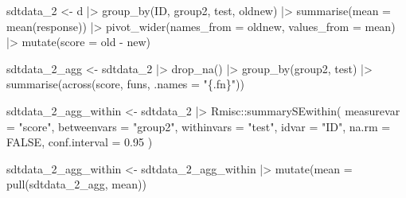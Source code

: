 \documentclass[
  man,floatsintext]{apa7}
\newenvironment{Shaded}{\begin{snugshade}}{\end{snugshade}}
\newcommand{\AttributeTok}[1]{\textcolor[rgb]{0.77,0.63,0.00}{#1}}
\newcommand{\ConstantTok}[1]{\textcolor[rgb]{0.00,0.00,0.00}{#1}}
\newcommand{\FloatTok}[1]{\textcolor[rgb]{0.00,0.00,0.81}{#1}}
\newcommand{\FunctionTok}[1]{\textcolor[rgb]{0.00,0.00,0.00}{#1}}
\newcommand{\NormalTok}[1]{#1}
\newcommand{\OtherTok}[1]{\textcolor[rgb]{0.56,0.35,0.01}{#1}}
\newcommand{\SpecialCharTok}[1]{\textcolor[rgb]{0.00,0.00,0.00}{#1}}
\newcommand{\StringTok}[1]{\textcolor[rgb]{0.31,0.60,0.02}{#1}}
\begin{document}
\begin{Shaded}
\begin{Highlighting}[]
\NormalTok{sdtdata\_2 }\OtherTok{\textless{}{-}}\NormalTok{ d }\SpecialCharTok{|\textgreater{}}
  \FunctionTok{group\_by}\NormalTok{(ID, group2, test, oldnew) }\SpecialCharTok{|\textgreater{}}
  \FunctionTok{summarise}\NormalTok{(}\AttributeTok{mean =} \FunctionTok{mean}\NormalTok{(response)) }\SpecialCharTok{|\textgreater{}}
  \FunctionTok{pivot\_wider}\NormalTok{(}\AttributeTok{names\_from =}\NormalTok{ oldnew, }\AttributeTok{values\_from =}\NormalTok{ mean) }\SpecialCharTok{|\textgreater{}}
  \FunctionTok{mutate}\NormalTok{(}\AttributeTok{score =}\NormalTok{ old }\SpecialCharTok{{-}}\NormalTok{ new)}

\NormalTok{sdtdata\_2\_agg }\OtherTok{\textless{}{-}}\NormalTok{ sdtdata\_2 }\SpecialCharTok{|\textgreater{}}
  \FunctionTok{drop\_na}\NormalTok{() }\SpecialCharTok{|\textgreater{}}
  \FunctionTok{group\_by}\NormalTok{(group2, test) }\SpecialCharTok{|\textgreater{}}
  \FunctionTok{summarise}\NormalTok{(}\FunctionTok{across}\NormalTok{(score, funs, }\AttributeTok{.names =} \StringTok{"\{.fn\}"}\NormalTok{))}

\NormalTok{sdtdata\_2\_agg\_within }\OtherTok{\textless{}{-}}\NormalTok{ sdtdata\_2 }\SpecialCharTok{|\textgreater{}}
\NormalTok{  Rmisc}\SpecialCharTok{::}\FunctionTok{summarySEwithin}\NormalTok{(}
    \AttributeTok{measurevar =} \StringTok{"score"}\NormalTok{,}
    \AttributeTok{betweenvars =} \StringTok{"group2"}\NormalTok{,}
    \AttributeTok{withinvars =} \StringTok{"test"}\NormalTok{,}
    \AttributeTok{idvar =} \StringTok{"ID"}\NormalTok{,}
    \AttributeTok{na.rm =} \ConstantTok{FALSE}\NormalTok{,}
    \AttributeTok{conf.interval =} \FloatTok{0.95}
\NormalTok{  )}

\NormalTok{sdtdata\_2\_agg\_within }\OtherTok{\textless{}{-}}\NormalTok{ sdtdata\_2\_agg\_within }\SpecialCharTok{|\textgreater{}}
  \FunctionTok{mutate}\NormalTok{(}\AttributeTok{mean =} \FunctionTok{pull}\NormalTok{(sdtdata\_2\_agg, mean))}


\end{Highlighting}
\end{Shaded}
\end{document}

